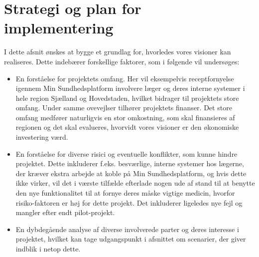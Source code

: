 \section{Strategi og plan for implementering}
I dette afsnit ønskes at bygge et grundlag for, hvorledes vores visioner kan realiseres.
Dette indebærer forskellige faktorer, som i følgende vil undersøges:
\begin{itemize}
  \item En forståelse for projektets omfang. Her vil eksempelvis receptfornyelse igennem Min Sundhedsplatform involvere læger og deres interne systemer i hele region Sjælland og Hovedstaden, hvilket bidrager til projektets store omfang. Under samme ovevejlser tilhører projektets finanser. Det store omfang medfører naturligvis en stor omkostning, som skal finansieres af regionen og det skal evalueres, hvorvidt vores visioner er den økonomiske investering værd. 
  \item En forståelse for diverse risici og eventuelle konflikter, som kunne hindre projektet. Dette inkluderer f.eks. besværlige, interne systemer hos lægerne, der kræver ekstra arbejde at koble på Min Sundhedsplatform, og hvis dette ikke virker, vil det i værste tilfælde efterlade nogen ude af stand til at benytte den nye funktionalitet til at fornye deres måske vigtige medicin, hvorfor risiko-faktoren er høj for dette projekt.
  Det inkluderer ligeledes nye fejl og mangler efter endt pilot-projekt.
  \item En dybdegående analyse af diverse involverede parter og deres interesse i projektet, hvilket kan tage udgangspunkt i afsnittet om scenarier, der giver indblik i netop dette. 
\end{itemize}

